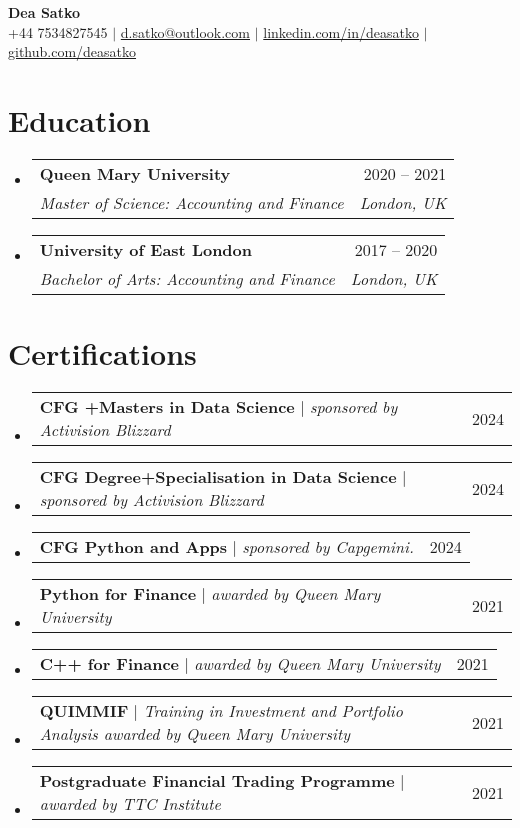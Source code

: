 \documentclass[letterpaper,11pt]{article}
\makeatletter
\newcommand{\resumeSubheading}[4]{
  \vspace{-2pt}\item
    \begin{tabular*}{0.97\textwidth}[t]{l@{\extracolsep{\fill}}r}
      \textbf{#1} & #2 \\
      \textit{\small#3} & \textit{\small #4} \\
    \end{tabular*}\vspace{-7pt}
}
\newcommand{\resumeProjectHeading}[2]{
    \item
    \begin{tabular*}{0.97\textwidth}{l@{\extracolsep{\fill}}r}
      \small#1 & #2 \\
    \end{tabular*}\vspace{-7pt}
}
\newcommand{\resumeSubHeadingListStart}{\begin{itemize}[leftmargin=0.15in, label={}]}
\newcommand{\resumeSubHeadingListEnd}{\end{itemize}}
\makeatother
\begin{document}
\begin{center}
    \textbf{\Huge Dea Satko} \\ \vspace{1pt}
    \small +44 7534827545 $|$ \href{mailto:d.satko@outlook.com}{{d.satko@outlook.com}} $|$ 
    \href{https://www.linkedin.com/in/deasatko/}{{linkedin.com/in/deasatko}} $|$
    \href{https://github.com/deasatko/}{{github.com/deasatko}}
\end{center}


\section{Education}
  \resumeSubHeadingListStart
    \resumeSubheading
      {Queen Mary University}{2020 -- 2021}
      {Master of Science: Accounting and Finance}{London, UK}
    \resumeSubheading
      {University of East London}{2017 -- 2020}
      {Bachelor of Arts: Accounting and Finance}{London, UK}
  \resumeSubHeadingListEnd

\section{Certifications}
  \resumeSubHeadingListStart
    \resumeProjectHeading
      {\textbf{CFG +Masters in Data Science} $|$ \emph{sponsored by Activision Blizzard}}{2024}
    \resumeProjectHeading
      {\textbf{CFG Degree+Specialisation in Data Science} $|$ \emph{sponsored by Activision Blizzard}}{2024}
    \resumeProjectHeading
      {\textbf{CFG Python and Apps} $|$ \emph{sponsored by Capgemini.}}{2024}
    \resumeProjectHeading
      {\textbf{Python for Finance} $|$ \emph{awarded by Queen Mary University}}{2021}
      \resumeProjectHeading
      {\textbf{C++ for Finance} $|$ \emph{awarded by Queen Mary University}}{2021}
    \resumeProjectHeading
      {\textbf{QUIMMIF} $|$ \emph{Training in Investment and Portfolio Analysis awarded by Queen Mary University}}{2021}
    \resumeProjectHeading
      {\textbf{Postgraduate Financial Trading Programme} $|$ \emph{awarded by TTC Institute}}{2021}
\resumeSubHeadingListEnd

\end{document}
